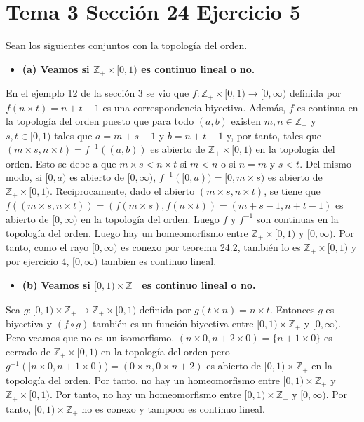 \documentclass{article}
\begin{document}
\section{Tema 3 Sección 24 Ejercicio 5}
Sean los siguientes conjuntos con la topología del orden.
\begin{itemize}
\item \bf (a) \rm Veamos si $\mathbb{Z}_+\times [0,1)$ es continuo lineal o no.
\end{itemize}
En el ejemplo 12 de la sección 3 se vio que $f:\mathbb{Z}_+\times [0,1)\rightarrow [0,\infty)$ definida por $f(n\times t)=n+ t-1$ es una correspondencia biyectiva. Además, $f$ es continua en la topología del orden puesto que para todo $(a,b)$ existen $m,n\in \mathbb{Z}_+$ y $s,t\in [0,1)$ tales que $a=m+s-1$ y $b=n+t-1$ y, por tanto, tales que   $(m\times s, n\times t)= f^{-1}((a,b))$ es abierto de $\mathbb{Z}_+\times [0,1)$ en la topología del orden. Esto se debe a que $m\times s < n\times t$ si $m<n$ o si $n=m$ y $s<t$. Del mismo modo, si $[0,a)$ es abierto de $[0,\infty)$, $f^{-1}([0,a))=[0, m\times s)$ es abierto de $\mathbb{Z}_+\times [0,1)$. Reciprocamente, dado el abierto $(m\times s, n\times t)$, se tiene que $f((m\times s, n\times t))=(f(m\times s),f(n\times t))= (m+s-1,n+t-1)$ es abierto de $[0,\infty)$ en la topología del orden. Luego $f$ y $f^{-1}$ son continuas en la topología del orden. Luego hay un homeomorfismo entre $\mathbb{Z}_+\times [0,1)$ y $[0,\infty)$. Por tanto, como el rayo $[0,\infty)$ es conexo por teorema 24.2, también lo es $\mathbb{Z}_+\times [0,1)$ y por ejercicio 4, $[0,\infty)$ tambien es continuo lineal.
\begin{itemize}
\item \bf (b) \rm Veamos si $ [0,1)\times \mathbb{Z}_+$ es continuo lineal o no.
\end{itemize}
Sea $g:[0,1)\times\mathbb{Z}_+ \rightarrow \mathbb{Z}_+\times [0,1)$ definida por $g(t\times n)=n\times t$. Entonces $g$ es biyectiva y $(f\circ g)$ también es un función biyectiva entre $[0,1)\times\mathbb{Z}_+$ y $[0,\infty)$. Pero veamos que no es un isomorfismo. $(n\times 0,n+2\times 0)=\{n+1\times 0\}$ es cerrado de $\mathbb{Z}_+\times [0,1)$ en la topología del orden pero $g^{-1}([n\times 0,n+1\times 0))= (0\times n,0\times n+2)$ es abierto de $[0,1)\times \mathbb{Z}_+$  en la topología del orden. Por tanto, no hay un homeomorfismo entre $[0,1)\times \mathbb{Z}_+ $ y $\mathbb{Z}_+ \times [0,1) $. Por tanto, no hay un homeomorfismo entre $[0,1)\times \mathbb{Z}_+ $ y $[0,\infty)$. Por tanto, $[0,1)\times \mathbb{Z}_+$ no es conexo y tampoco es continuo lineal.
\end{document}
